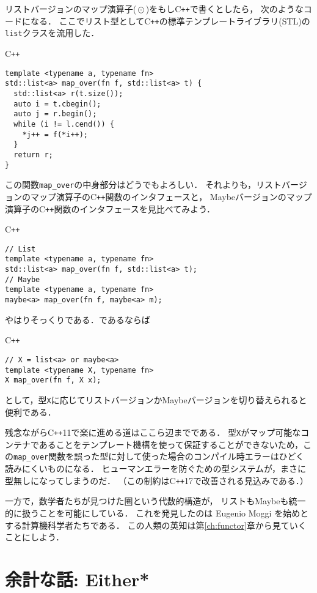 \documentclass[a5paper,draft]{jsbook}
\newcommand{\programminglanguage}[1]{\textsf{#1}}
\newcommand{\cxx}{\programminglanguage{C}\texttt{++}}
\newcommand{\code}[1]{\texttt{#1}}
\newenvironment{cxxcode}{\begin{itembox}[r]{\cxx}}{\end{itembox}}
\newcommand{\mathBinaryOperator}[1]{\operatorname{#1}}
\newcommand{\mathMap}{\mathBinaryOperator{\odot}}
\begin{document}
リストバージョンのマップ演算子($\mathMap$)をもし\cxx で書くとしたら，
次のようなコードになる．
ここでリスト型として\cxx の標準テンプレートライブラリ(STL)の
\code{list}クラスを流用した．
\begin{cxxcode}
\begin{verbatim}
template <typename a, typename fn>
std::list<a> map_over(fn f, std::list<a> t) {
  std::list<a> r(t.size());
  auto i = t.cbegin();
  auto j = r.begin();
  while (i != l.cend()) {
    *j++ = f(*i++);
  }
  return r;
}
\end{verbatim}
\end{cxxcode}
この関数\code{map\_over}の中身部分はどうでもよろしい．
それよりも，リストバージョンのマップ演算子の\cxx 関数のインタフェースと，
Maybeバージョンのマップ演算子の\cxx 関数のインタフェースを見比べてみよう．
\begin{cxxcode}
\begin{verbatim}
// List
template <typename a, typename fn>
std::list<a> map_over(fn f, std::list<a> t);
// Maybe
template <typename a, typename fn>
maybe<a> map_over(fn f, maybe<a> m);
\end{verbatim}
\end{cxxcode}
やはりそっくりである．であるならば
\begin{cxxcode}
\begin{verbatim}
// X = list<a> or maybe<a>
template <typename X, typename fn>
X map_over(fn f, X x);
\end{verbatim}
\end{cxxcode}
として，型\code{X}に応じてリストバージョンかMaybeバージョンを切り替えられると便利である．

残念ながら\cxx11で楽に進める道はここら辺までである．
型\code{X}がマップ可能なコンテナであることをテンプレート機構を使って保証することができないため，この\code{map\_over}関数を誤った型に対して使った場合のコンパイル時エラーはひどく読みにくいものになる．
ヒューマンエラーを防ぐための型システムが，まさに型無しになってしまうのだ．
（この制約は\cxx17で改善される見込みである．）

一方で，数学者たちが見つけた圏という代数的構造が，
リストもMaybeも統一的に扱うことを可能にしている．
これを発見したのは Eugenio Moggi を始めとする計算機科学者たちである．
この人類の英知は第\ref{ch:functor}章から見ていくことにしよう．


\section{余計な話: Either*}
\end{document}
